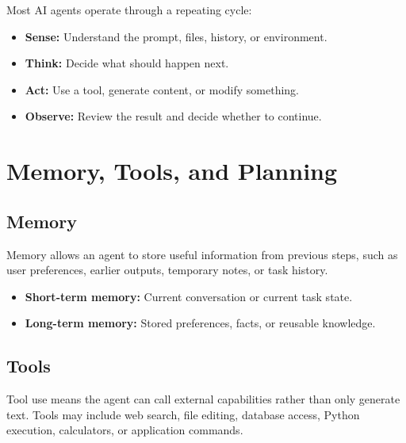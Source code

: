 \documentclass[11pt,a4paper]{article}
\begin{document}
\begin{definitionbox}
Most AI agents operate through a repeating cycle:
\begin{itemize}[leftmargin=*]
  \item \textbf{Sense:} Understand the prompt, files, history, or environment.
  \item \textbf{Think:} Decide what should happen next.
  \item \textbf{Act:} Use a tool, generate content, or modify something.
  \item \textbf{Observe:} Review the result and decide whether to continue.
\end{itemize}
\end{definitionbox}

\section{Memory, Tools, and Planning}

\subsection{Memory}

\begin{definitionbox}
Memory allows an agent to store useful information from previous steps, such as user preferences, earlier outputs, temporary notes, or task history.
\end{definitionbox}

\begin{itemize}[leftmargin=*]
  \item \textbf{Short-term memory:} Current conversation or current task state.
  \item \textbf{Long-term memory:} Stored preferences, facts, or reusable knowledge.
\end{itemize}

\subsection{Tools}

\begin{definitionbox}
Tool use means the agent can call external capabilities rather than only generate text. Tools may include web search, file editing, database access, Python execution, calculators, or application commands.
\end{definitionbox}
\end{document}

